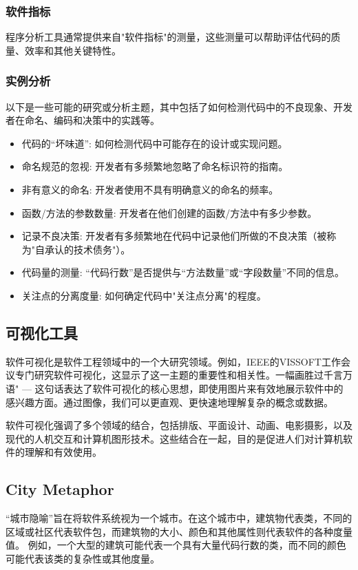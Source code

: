 \subsubsection{软件指标}
程序分析工具通常提供来自"软件指标"的测量，这些测量可以帮助评估代码的质量、效率和其他关键特性。

\subsubsection{实例分析}
以下是一些可能的研究或分析主题，其中包括了如何检测代码中的不良现象、开发者在命名、编码和决策中的实践等。
\begin{itemize}
	\item 代码的“坏味道”: 如何检测代码中可能存在的设计或实现问题。
	\item 命名规范的忽视: 开发者有多频繁地忽略了命名标识符的指南。
	\item 非有意义的命名: 开发者使用不具有明确意义的命名的频率。
	\item 函数/方法的参数数量: 开发者在他们创建的函数/方法中有多少参数。
	\item 记录不良决策: 开发者有多频繁地在代码中记录他们所做的不良决策（被称为"自承认的技术债务"）。
	\item 代码量的测量: “代码行数”是否提供与“方法数量”或“字段数量”不同的信息。
	\item 关注点的分离度量: 如何确定代码中"关注点分离"的程度。
\end{itemize}



\subsection{可视化工具}
软件可视化是软件工程领域中的一个大研究领域。例如，IEEE的VISSOFT工作会议专门研究软件可视化，这显示了这一主题的重要性和相关性。一幅画胜过千言万语" — 这句话表达了软件可视化的核心思想，即使用图片来有效地展示软件中的感兴趣方面。通过图像，我们可以更直观、更快速地理解复杂的概念或数据。

软件可视化强调了多个领域的结合，包括排版、平面设计、动画、电影摄影，以及现代的人机交互和计算机图形技术。这些结合在一起，目的是促进人们对计算机软件的理解和有效使用。

\subsection{City Metaphor}

“城市隐喻”旨在将软件系统视为一个城市。在这个城市中，建筑物代表类，不同的区域或社区代表软件包，而建筑物的大小、颜色和其他属性则代表软件的各种度量值。
例如，一个大型的建筑可能代表一个具有大量代码行数的类，而不同的颜色可能代表该类的复杂性或其他度量。

